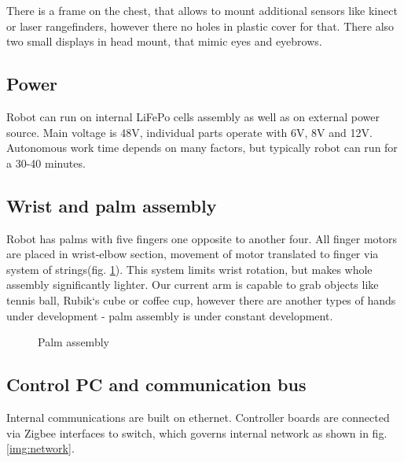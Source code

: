 \documentclass[letterpaper, 10 pt, conference]{ieeeconf}  %
\begin{document}
There is a frame on the chest, that allows to mount additional sensors like
kinect or laser rangefinders, however there no holes in plastic cover for that.
There also two small displays in head mount, that mimic eyes and eyebrows.

\subsection{Power}
Robot can run on internal LiFePo cells assembly as well as on external power
source. Main voltage is 48V, individual parts operate with 6V, 8V and 12V.
Autonomous work time depends on many factors, but typically robot can run for a
30-40 minutes.
 
\subsection{Wrist and palm assembly}
Robot has palms with five fingers one opposite to another four. All
finger motors are placed in wrist-elbow section, movement of motor translated to finger
via system of strings(fig. \ref{img:wrist}). This system limits wrist rotation,
but makes whole assembly significantly lighter. Our current arm is capable to grab objects like
tennis ball, Rubik`s cube or coffee cup, however there are
another types of hands under development - palm assembly is under
constant development.

\begin{figure}[thpb]
\caption{Palm assembly}
\label{img:wrist}
\end{figure}  

\subsection{Control PC and communication bus}

Internal communications are built on ethernet. Controller boards are connected
via Zigbee interfaces to switch, which governs internal network as shown
in fig. \ref{img:network}.
\end{document}
